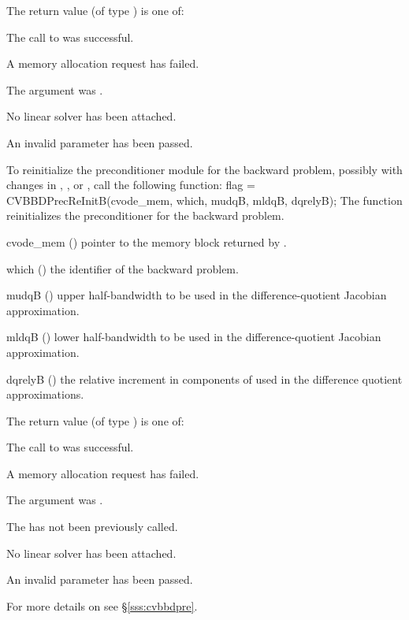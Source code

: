 {
  The return value  (of type ) is one of:
  \begin{args}
  \item[\Id{CVSPILS\_SUCCESS}]
    The call to  was successful.
  \item[\Id{CVSPILS\_MEM\_FAIL}]
    A memory allocation request has failed.
  \item[\Id{CVSPILS\_MEM\_NULL}]
    The  argument was .
  \item[\Id{CVSPILS\_LMEM\_NULL}]
    No linear solver has been attached.
  \item[\Id{CVSPILS\_ILL\_INPUT}]
    An invalid parameter has been passed.
  \end{args}
}
{}
To reinitialize the {\cvbbdpre} preconditioner module for the backward problem,
possibly with changes in , , or , call the following 
function:
{
  flag = CVBBDPrecReInitB(cvode\_mem, which, mudqB, mldqB, dqrelyB);
}
{
  The function  reinitializes the {\cvbbdpre} preconditioner
  for the backward problem.
}
{
  \begin{args}
  \item[cvode\_mem] ()
    pointer to the {\cvodes} memory block returned by .
  \item[which] ()
    the identifier of the backward problem.
  \item[mudqB] ()
    upper half-bandwidth to be used in the difference-quotient Jacobian approximation.
  \item[mldqB] ()
    lower half-bandwidth to be used in the difference-quotient Jacobian approximation.
  \item[dqrelyB] ()
    the relative increment in components of  used in the difference quotient
    approximations.
  \end{args}
}
{
  The return value  (of type ) is one of:
  \begin{args}
  \item[\Id{CVSPILS\_SUCCESS}]
    The call to  was successful.
  \item[\Id{CVSPILS\_MEM\_FAIL}]
    A memory allocation request has failed.
  \item[\Id{CVSPILS\_MEM\_NULL}]
    The  argument was .
  \item[\Id{CVSPILS\_PMEM\_NULL}]
    The  has not been previously called.
  \item[\Id{CVSPILS\_LMEM\_NULL}]
    No linear solver has been attached.
  \item[\Id{CVSPILS\_ILL\_INPUT}]
    An invalid parameter has been passed.
  \end{args}
}
{}
For more details on {\cvbbdpre} see \S\ref{sss:cvbbdpre}.

